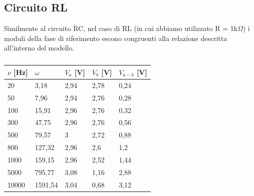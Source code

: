 \subsection{Circuito RL}
Similmente al circuito RC, nel caso di RL (in cui abbiamo utilizzato R = 1k$\Omega $) i moduli della fase di riferimento escono congruenti alla relazione descritta all’interno del modello.
\begin{table}[!ht]
    \centering
    \begin{tabular}{lllll}
    \toprule
        $\nu$ [Hz]  & $\omega$ & $V_a$ [V] & $V_b$ [V] & $V_{a-b}$ [V]  \\ \midrule
        20  & 3,18 & 2,94 & 2,78 & 0,24  \\ 
        50  & 7,96 & 2,94 & 2,76 & 0,28  \\ 
        100  & 15,91 & 2,96 & 2,76 & 0,32  \\
        300  & 47,75 & 2,96 & 2,76 & 0,56  \\
        500  & 79,57 & 3 & 2,72 & 0,88  \\ 
        800  & 127,32 & 2,96 & 2,6 & 1,2  \\ 
        1000  & 159,15 & 2,96 & 2,52 & 1,44  \\ 
        5000  & 795,77 & 3,08 & 1,16 & 2,88  \\
        10000  & 1591,54 & 3,04 & 0,68 & 3,12  \\ \bottomrule
    \end{tabular}
    \label{tabella 2}
    \caption{}
\end{table}


